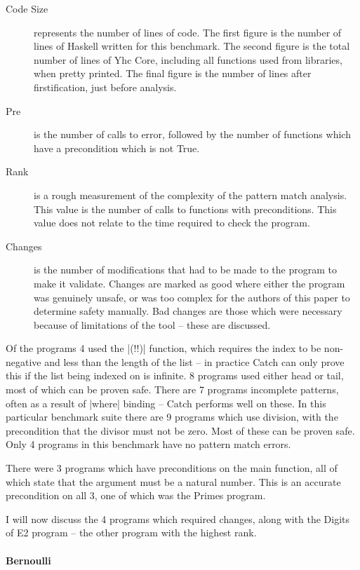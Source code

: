 \documentclass[preprint]{sigplanconf}
\newcommand{\C}[1]{\textsf{#1}}
\begin{document}
\begin{description}
\item[Code Size] represents the number of lines of code. The first figure is the number of lines of Haskell written for this benchmark. The second figure is the total number of lines of Yhc Core, including all functions used from libraries, when pretty printed. The final figure is the number of lines after firstification, just before analysis.

\item[Pre] is the number of calls to error, followed by the number of functions which have a precondition which is not True.

\item[Rank] is a rough measurement of the complexity of the pattern match analysis. This value is the number of calls to functions with preconditions. This value does not relate to the time required to check the program.

\item[Changes] is the number of modifications that had to be made to the program to make it validate. Changes are marked as good where either the program was genuinely unsafe, or was too complex for the authors of this paper to determine safety manually. Bad changes are those which were necessary because of limitations of the tool -- these are discussed.
\end{description}

Of the programs 4 used the |(!!)| function, which requires the index to be non-negative and less than the length of the list -- in practice Catch can only prove this if the list being indexed on is infinite. 8 programs used either \C{head} or \C{tail}, most of which can be proven safe. There are 7 programs incomplete patterns, often as a result of |where| binding -- Catch performs well on these. In this particular benchmark suite there are 9 programs which use division, with the precondition that the divisor must not be zero. Most of these can be proven safe. Only 4 programs in this benchmark have no pattern match errors.

There were 3 programs which have preconditions on the \C{main} function, all of which state that the argument must be a natural number. This is an accurate precondition on all 3, one of which was the Primes program.

I will now discuss the 4 programs which required changes, along with the Digits of E2 program -- the other program with the highest rank.

\paragraph{Bernoulli}
\end{document}
